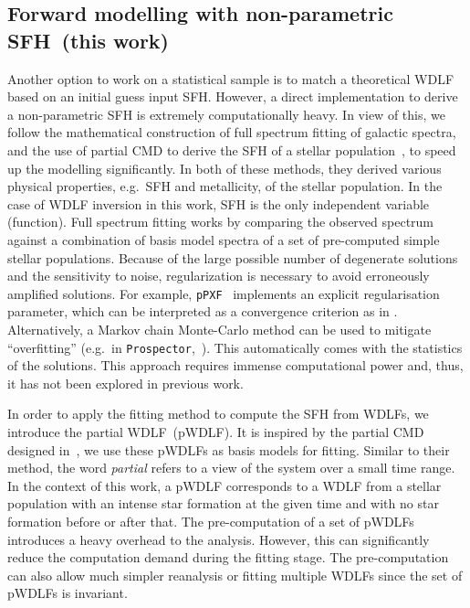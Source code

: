 \documentclass[fleqn,usenatbib]{mnras}
\begin{document}
\subsection{Forward modelling with non-parametric SFH~(this work)}
Another option to work on a statistical sample is to match a theoretical
WDLF based on an initial guess input SFH. However, a direct implementation to derive a
non-parametric SFH is extremely computationally heavy. In view of this, we
follow the mathematical construction of full spectrum fitting of galactic
spectra, and the use of partial CMD to derive the SFH of a stellar
population~\citep{2006A&A...459..783C}, to speed up the modelling significantly.
In both of these methods, they derived various physical properties, e.g.\ SFH
and metallicity, of the stellar population. In the case of WDLF inversion in
this work, SFH is the only independent variable (function). Full spectrum
fitting works by comparing the observed spectrum against a combination of basis
model spectra of a set of pre-computed simple stellar populations. Because of
the large possible number of degenerate solutions and the sensitivity to noise,
regularization is necessary to avoid erroneously amplified
solutions. For example, \texttt{pPXF}~\citep{2023MNRAS.526.3273C} implements an 
explicit regularisation parameter, which can be interpreted as a convergence 
criterion as in  \citet{2013MNRAS.434.1549R}. Alternatively, a Markov chain
Monte-Carlo method can be used to mitigate ``overfitting'' (e.g.\ in 
\texttt{Prospector},~\citealp{2021ApJS..254...22J}). This automatically comes
with the statistics of the solutions. This approach requires immense
computational power and, thus, it has not been explored in previous work.

In order to apply the fitting method to compute the SFH from WDLFs, we introduce
the partial WDLF~(pWDLF). It is inspired by the partial CMD designed
in~\citep{2006A&A...459..783C}, we use these pWDLFs as basis models for fitting.
Similar to their method, the word \textit{partial} refers to a view of the
system over a small time range. In the context of this work, a pWDLF corresponds
to a WDLF from a stellar population with an intense star formation at the given
time and with no star formation before or after that. The pre-computation of a
set of pWDLFs introduces a heavy overhead to the analysis. However, this can
significantly reduce the computation demand during the fitting stage. The
pre-computation can also allow much simpler reanalysis or fitting multiple
WDLFs since the set of pWDLFs is invariant.
\end{document}
